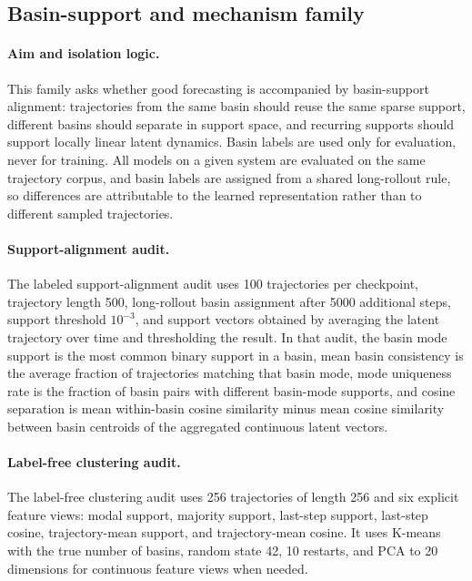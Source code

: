 \subsection{Basin-support and mechanism family}

\paragraph{Aim and isolation logic.}
This family asks whether good forecasting is accompanied by basin-support
alignment: trajectories from the same basin should reuse the same sparse
support, different basins should separate in support space, and recurring
supports should support locally linear latent dynamics. Basin labels are used
only for evaluation, never for training. All models on a given system are
evaluated on the same trajectory corpus, and basin labels are assigned from a
shared long-rollout rule, so differences are attributable to the learned
representation rather than to different sampled trajectories.

\paragraph{Support-alignment audit.}
The labeled support-alignment audit uses 100 trajectories per checkpoint,
trajectory length 500, long-rollout basin assignment after 5000 additional
steps, support threshold $10^{-3}$, and support vectors obtained by averaging the
latent trajectory over time and thresholding the result. In that audit, the
basin mode support is the most common binary support in a basin, mean basin
consistency is the average fraction of trajectories matching that basin mode,
mode uniqueness rate is the fraction of basin pairs with different basin-mode
supports, and cosine separation is mean within-basin cosine similarity minus
mean cosine similarity between basin centroids of the aggregated continuous
latent vectors.

\paragraph{Label-free clustering audit.}
The label-free clustering audit uses 256 trajectories of length 256 and six
explicit feature views: modal support, majority support, last-step support,
last-step cosine, trajectory-mean support, and trajectory-mean cosine. It uses
K-means with the true number of basins, random state 42, 10 restarts, and PCA
to 20 dimensions for continuous feature views when needed.

